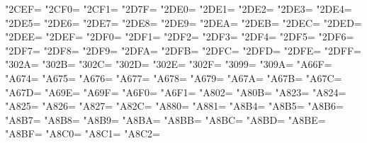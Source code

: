 \XeTeXcharclass"2CEF=\KclassCM
\XeTeXcharclass"2CF0=\KclassCM
\XeTeXcharclass"2CF1=\KclassCM
\XeTeXcharclass"2D7F=\KclassCM
\XeTeXcharclass"2DE0=\KclassCM
\XeTeXcharclass"2DE1=\KclassCM
\XeTeXcharclass"2DE2=\KclassCM
\XeTeXcharclass"2DE3=\KclassCM
\XeTeXcharclass"2DE4=\KclassCM
\XeTeXcharclass"2DE5=\KclassCM
\XeTeXcharclass"2DE6=\KclassCM
\XeTeXcharclass"2DE7=\KclassCM
\XeTeXcharclass"2DE8=\KclassCM
\XeTeXcharclass"2DE9=\KclassCM
\XeTeXcharclass"2DEA=\KclassCM
\XeTeXcharclass"2DEB=\KclassCM
\XeTeXcharclass"2DEC=\KclassCM
\XeTeXcharclass"2DED=\KclassCM
\XeTeXcharclass"2DEE=\KclassCM
\XeTeXcharclass"2DEF=\KclassCM
\XeTeXcharclass"2DF0=\KclassCM
\XeTeXcharclass"2DF1=\KclassCM
\XeTeXcharclass"2DF2=\KclassCM
\XeTeXcharclass"2DF3=\KclassCM
\XeTeXcharclass"2DF4=\KclassCM
\XeTeXcharclass"2DF5=\KclassCM
\XeTeXcharclass"2DF6=\KclassCM
\XeTeXcharclass"2DF7=\KclassCM
\XeTeXcharclass"2DF8=\KclassCM
\XeTeXcharclass"2DF9=\KclassCM
\XeTeXcharclass"2DFA=\KclassCM
\XeTeXcharclass"2DFB=\KclassCM
\XeTeXcharclass"2DFC=\KclassCM
\XeTeXcharclass"2DFD=\KclassCM
\XeTeXcharclass"2DFE=\KclassCM
\XeTeXcharclass"2DFF=\KclassCM
\XeTeXcharclass"302A=\KclassCM
\XeTeXcharclass"302B=\KclassCM
\XeTeXcharclass"302C=\KclassCM
\XeTeXcharclass"302D=\KclassCM
\XeTeXcharclass"302E=\KclassCM
\XeTeXcharclass"302F=\KclassCM
\XeTeXcharclass"3099=\KclassCM
\XeTeXcharclass"309A=\KclassCM
\XeTeXcharclass"A66F=\KclassCM
\XeTeXcharclass"A674=\KclassCM
\XeTeXcharclass"A675=\KclassCM
\XeTeXcharclass"A676=\KclassCM
\XeTeXcharclass"A677=\KclassCM
\XeTeXcharclass"A678=\KclassCM
\XeTeXcharclass"A679=\KclassCM
\XeTeXcharclass"A67A=\KclassCM
\XeTeXcharclass"A67B=\KclassCM
\XeTeXcharclass"A67C=\KclassCM
\XeTeXcharclass"A67D=\KclassCM
\XeTeXcharclass"A69E=\KclassCM
\XeTeXcharclass"A69F=\KclassCM
\XeTeXcharclass"A6F0=\KclassCM
\XeTeXcharclass"A6F1=\KclassCM
\XeTeXcharclass"A802=\KclassCM
\XeTeXcharclass"A80B=\KclassCM
\XeTeXcharclass"A823=\KclassCM
\XeTeXcharclass"A824=\KclassCM
\XeTeXcharclass"A825=\KclassCM
\XeTeXcharclass"A826=\KclassCM
\XeTeXcharclass"A827=\KclassCM
\XeTeXcharclass"A82C=\KclassCM
\XeTeXcharclass"A880=\KclassCM
\XeTeXcharclass"A881=\KclassCM
\XeTeXcharclass"A8B4=\KclassCM
\XeTeXcharclass"A8B5=\KclassCM
\XeTeXcharclass"A8B6=\KclassCM
\XeTeXcharclass"A8B7=\KclassCM
\XeTeXcharclass"A8B8=\KclassCM
\XeTeXcharclass"A8B9=\KclassCM
\XeTeXcharclass"A8BA=\KclassCM
\XeTeXcharclass"A8BB=\KclassCM
\XeTeXcharclass"A8BC=\KclassCM
\XeTeXcharclass"A8BD=\KclassCM
\XeTeXcharclass"A8BE=\KclassCM
\XeTeXcharclass"A8BF=\KclassCM
\XeTeXcharclass"A8C0=\KclassCM
\XeTeXcharclass"A8C1=\KclassCM
\XeTeXcharclass"A8C2=\KclassCM
